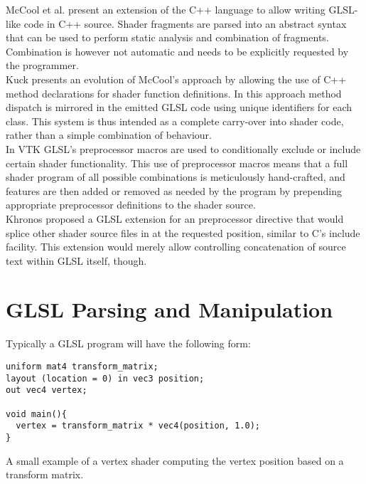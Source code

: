 \documentclass{sig-alternate}
\begin{document}
McCool et al.\cite{mccool2002shader} present an extension of the C++ language to allow writing GLSL-like code in C++ source. Shader fragments are parsed into an abstract syntax that can be used to perform static analysis and combination of fragments. Combination is however not automatic and needs to be explicitly requested by the programmer. \\

Kuck\cite{kuck2007object} presents an evolution of McCool's approach by allowing the use of C++ method declarations for shader function definitions. In this approach method dispatch is mirrored in the emitted GLSL code using unique identifiers for each class. This system is thus intended as a complete carry-over into shader code, rather than a simple combination of behaviour. \\

In VTK\cite{vtk} GLSL's  preprocessor macros are used to conditionally exclude or include certain shader functionality. This use of preprocessor macros means that a full shader program of all possible combinations is meticulously hand-crafted, and features are then added or removed as needed by the program by prepending appropriate preprocessor definitions to the shader source. \\

Khronos proposed a GLSL extension\cite{arbinclude} for an  preprocessor directive that would splice other shader source files in at the requested position, similar to C's include facility. This extension would merely allow controlling concatenation of source text within GLSL itself, though.

\section{GLSL Parsing and Manipulation}\label{section:3}
Typically a GLSL program will have the following form:

\begin{listing}[h]
\begin{verbatim}
uniform mat4 transform_matrix;
layout (location = 0) in vec3 position;
out vec4 vertex;

void main(){
  vertex = transform_matrix * vec4(position, 1.0);
}
\end{verbatim}
\caption{A small example of a vertex shader computing the vertex position based on a transform matrix.}
\label{lst:vertex}
\end{listing}
\end{document}
